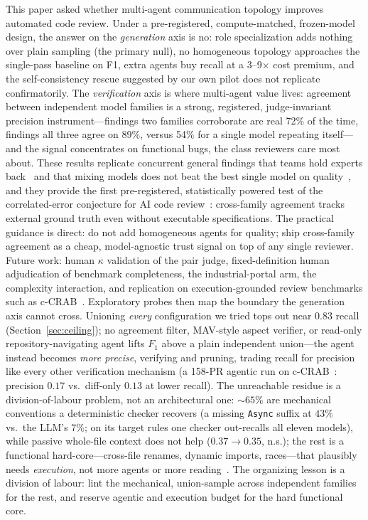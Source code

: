 \documentclass[conference]{IEEEtran}
\begin{document}
This paper asked whether multi-agent communication topology improves
automated code review. Under a pre-registered, compute-matched,
frozen-model design, the answer on the \emph{generation} axis is no: role
specialization adds nothing over plain sampling (the primary null), no
homogeneous topology approaches the single-pass baseline on F1, extra
agents buy recall at a 3--9$\times$ cost premium, and the self-consistency
rescue suggested by our own pilot does not replicate confirmatorily. The
\emph{verification} axis is where multi-agent value lives: agreement
between independent model families is a strong, registered,
judge-invariant precision instrument---findings two families corroborate
are real 72\% of the time, findings all three agree on 89\%, versus 54\%
for a single model repeating itself---and the signal concentrates on
functional bugs, the class reviewers care most about. These results
replicate concurrent general findings that teams hold experts
back~\cite{pappu} and that mixing models does not beat the best single
model on quality~\cite{selfmoa}, and they provide the first
pre-registered, statistically powered test of the correlated-error
conjecture for AI code review~\cite{zietsman}: cross-family agreement
tracks external ground truth even without executable specifications.
The practical guidance is direct: do not add homogeneous agents for
quality; ship cross-family agreement as a cheap, model-agnostic trust
signal on top of any single reviewer. Future work: human $\kappa$
validation of the pair judge, fixed-definition human adjudication of
benchmark completeness, the industrial-portal arm, the complexity
interaction, and replication on execution-grounded review benchmarks such
as c-CRAB~\cite{crab}. Exploratory probes then map the boundary the generation axis cannot cross.
Unioning \emph{every} configuration we tried tops out near $0.83$ recall
(Section~\ref{sec:ceiling}); no agreement filter, MAV-style aspect verifier, or
read-only repository-navigating agent lifts $F_1$ above a plain independent
union---the agent instead becomes \emph{more precise}, verifying and pruning,
trading recall for precision like every other verification mechanism (a 158-PR
agentic run on c-CRAB~\cite{crab}: precision $0.17$ vs.\ diff-only $0.13$ at lower
recall). The unreachable residue is a division-of-labour problem, not an
architectural one: ${\sim}65\%$ are mechanical conventions a deterministic checker
recovers (a missing \texttt{Async} suffix at $43\%$ vs.\ the LLM's $7\%$; on its
target rules one checker out-recalls all eleven models), while passive whole-file
context does not help ($0.37{\to}0.35$, n.s.); the rest is a functional
hard-core---cross-file renames, dynamic imports, races---that plausibly needs
\emph{execution}, not more agents or more reading~\cite{swereview}. The organizing
lesson is a division of labour: lint the mechanical, union-sample across
independent families for the rest, and reserve agentic and execution budget for
the hard functional core.
\end{document}
